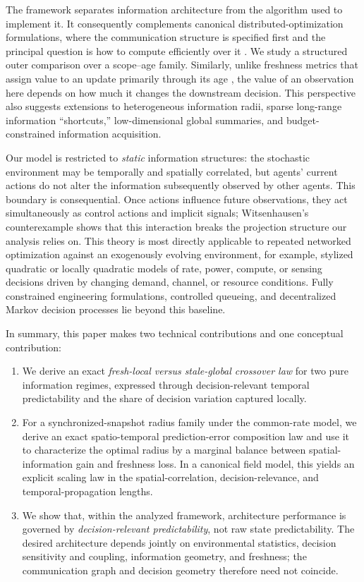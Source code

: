 \documentclass[11pt]{article}
\begin{document}
The framework separates information architecture from the
algorithm used to implement it. It consequently complements canonical
distributed-optimization formulations, where the communication structure is
specified first and the principal question is how to compute efficiently over it
\cite{nedic2009distributed}. We study a structured outer comparison over a
scope--age family. Similarly, unlike freshness metrics that
assign value to an update primarily through its age
\cite{kaul2012realtime}, the value of an observation here depends on how much
it changes the downstream decision. This perspective also suggests extensions
to heterogeneous information radii, sparse long-range information
``shortcuts,'' low-dimensional global summaries, and budget-constrained
information acquisition.

Our model is restricted to \emph{static} information structures:
the stochastic environment may be temporally and spatially correlated, but
agents' current actions do not alter the information subsequently observed by
other agents. This boundary is consequential. Once actions influence future
observations, they act simultaneously as control actions and implicit signals;
Witsenhausen's counterexample \cite{witsenhausen1968counterexample} shows that
this interaction breaks the projection structure our analysis relies on. This
theory is most directly applicable to repeated networked optimization
against an exogenously evolving environment, for example, stylized quadratic
or locally quadratic models of rate, power, compute, or sensing decisions
driven by changing demand, channel, or resource conditions. Fully constrained
engineering formulations, controlled queueing, and decentralized Markov
decision processes lie beyond this baseline.

In summary, this paper makes two technical contributions and one conceptual
contribution:
\begin{enumerate}
    \item We derive an exact \emph{fresh-local versus stale-global crossover
    law} for two pure information regimes, expressed through decision-relevant
    temporal predictability and the share of decision variation captured
    locally.

    \item For a synchronized-snapshot radius family under the common-rate
    model, we derive an exact spatio-temporal prediction-error composition law
    and use it to characterize the optimal radius by a marginal balance between
    spatial-information gain and freshness loss. In a canonical field model,
    this yields an explicit scaling law in the spatial-correlation,
    decision-relevance, and temporal-propagation lengths.

    \item We show that, within the analyzed framework, architecture performance is governed by
    \emph{decision-relevant predictability}, not raw state predictability. The
    desired architecture depends jointly on environmental statistics, decision
    sensitivity and coupling, information geometry, and freshness; the
    communication graph and decision geometry therefore need not coincide.
\end{enumerate}
\end{document}
